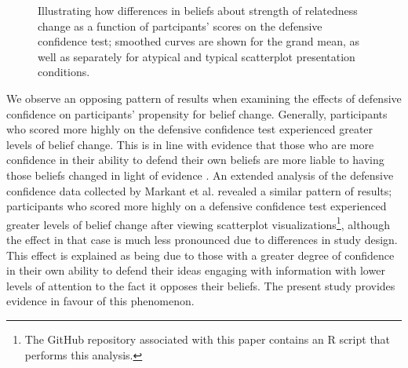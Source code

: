 \documentclass[manuscript,screen,review]{acmart}
\begin{document}
\begin{figure}


\caption{\label{fig-dc-smooth}Illustrating how differences in beliefs
about strength of relatedness change as a function of partcipants'
scores on the defensive confidence test; smoothed curves are shown for
the grand mean, as well as separately for atypical and typical
scatterplot presentation conditions.}

\end{figure}%

We observe an opposing pattern of results when examining the effects of
defensive confidence on participants' propensity for belief change.
Generally, participants who scored more highly on the defensive
confidence test experienced greater levels of belief change. This is in
line with evidence that those who are more confidence in their ability
to defend their own beliefs are more liable to having those beliefs
changed in light of evidence \citep{albarracin_2004}. An extended
analysis of the defensive confidence data collected by Markant et al.
\citep{markant_2023} revealed a similar pattern of results; participants
who scored more highly on a defensive confidence test experienced
greater levels of belief change after viewing scatterplot
visualizations\footnote{The GitHub repository associated with this paper
  contains an R script that performs this analysis.}, although the
effect in that case is much less pronounced due to differences in study
design. This effect is explained as being due to those with a greater
degree of confidence in their own ability to defend their ideas engaging
with information with lower levels of attention to the fact it opposes
their beliefs. The present study provides evidence in favour of this
phenomenon.
\end{document}
